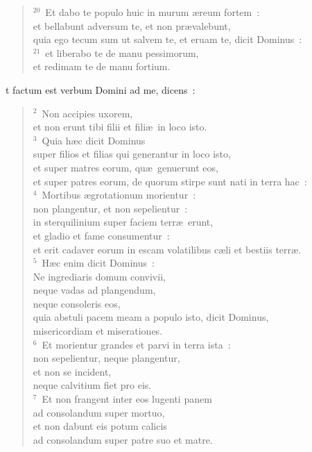\begin{verse}
${}^{20}$~Et dabo te populo huic in murum \ae reum fortem~:\\ et bellabunt adversum te, et non pr\ae valebunt,\\ quia ego tecum sum ut salvem te, et eruam te, dicit Dominus~:\\
${}^{21}$~et liberabo te de manu pessimorum,\\ et redimam te de manu fortium.\end{verse}



\bchapter
{}t factum est verbum Domini ad me, dicens~:
\begin{verse}${}^{2}$~Non accipies uxorem,\\ et non erunt tibi filii et fili\ae\ in loco isto.\\
${}^{3}$~Quia h\ae c dicit Dominus\\ super filios et filias qui generantur in loco isto,\\ et super matres eorum, qu\ae\ genuerunt eos,\\ et super patres eorum, de quorum stirpe sunt nati in terra hac~:\\
${}^{4}$~Mortibus \ae grotationum morientur~:\\ non plangentur, et non sepelientur~:\\ in sterquilinium super faciem terr\ae\ erunt,\\ et gladio et fame consumentur~:\\ et erit cadaver eorum in escam volatilibus c\ae li et bestiis terr\ae .\\
${}^{5}$~H\ae c enim dicit Dominus~:\\ Ne ingrediaris domum convivii,\\ neque vadas ad plangendum,\\ neque consoleris eos,\\ quia abstuli pacem meam a populo isto, dicit Dominus,\\ misericordiam et miserationes.\\
${}^{6}$~Et morientur grandes et parvi in terra ista~:\\ non sepelientur, neque plangentur,\\ et non se incident,\\ neque calvitium fiet pro eis.\\
${}^{7}$~Et non frangent inter eos lugenti panem\\ ad consolandum super mortuo,\\ et non dabunt eis potum calicis\\ ad consolandum super patre suo et matre.\\

\end{verse}
